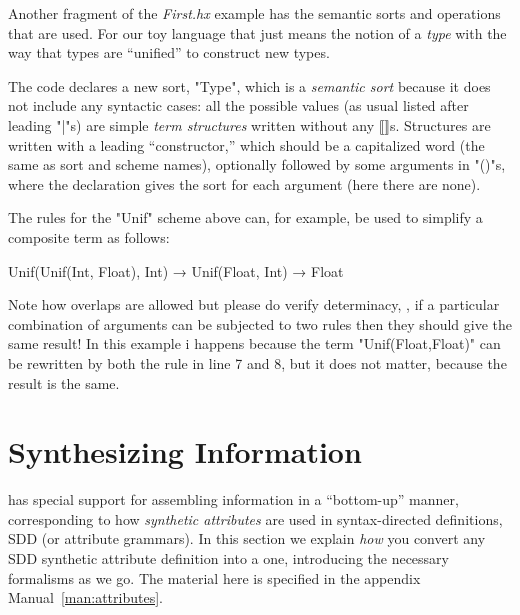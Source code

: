\documentclass[11pt]{article} %
\begin{document}
\begin{example}\label{ex:unif}
  Another fragment of the \emph{First.hx} example has the semantic sorts and operations that are
  used. For our toy language that just means the notion of a \emph{type} with the way that types are
  ``unified'' to construct new types.
  The code declares a new sort, "Type", which is a \emph{semantic sort} because it does not include
  any syntactic cases: all the possible values (as usual listed after leading "|"s) are simple
  \emph{term structures} written without any ⟦⟧s.  Structures are written with a leading
  ``constructor,'' which should be a capitalized word (the same as sort and scheme names),
  optionally followed by some arguments in "()"s, where the declaration gives the sort for each
  argument (here there are none).

  The rules for the "Unif" scheme above can, for example, be used to simplify a composite term as
  follows:
  \begin{hacs}[xleftmargin=\parindent,xrightmargin=\parindent]
Unif(Unif(Int, Float), Int) → Unif(Float, Int) → Float
  \end{hacs}
  Note how overlaps are allowed but please do verify determinacy, \ie, if a particular combination
  of arguments can be subjected to two rules then they should give the same result! In this example
  i happens because the term "Unif(Float,Float)" can be rewritten by both the rule in line 7 and 8,
  but it does not matter, because the result is the same.
\end{example}


\section{Synthesizing Information}
\label{sec:collect}

\HAX has special support for assembling information in a ``bottom-up'' manner, corresponding to how
\emph{synthetic attributes} are used in syntax-directed definitions, \aka SDD (or attribute
grammars).  In this section we explain \emph{how} you convert any SDD synthetic attribute definition
into a \HAX one, introducing the necessary \HAX formalisms as we go.  The material here is specified
in the appendix Manual~\ref{man:attributes}.
\end{document}

